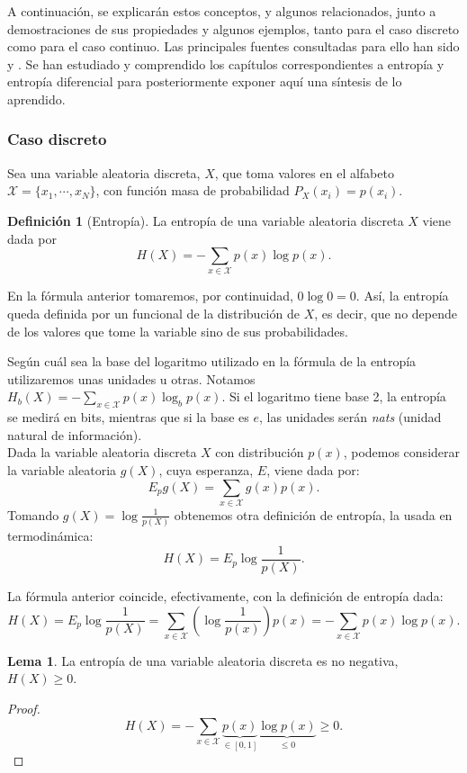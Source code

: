 \documentclass[10pt,a4paper]{article} %
\theoremstyle{definition}
\newtheorem{definition}{Definición}[section]
\newtheorem{lemma}[theorem]{Lema}
\begin{document}
A continuación, se explicarán estos conceptos, y algunos relacionados, junto a demostraciones de sus propiedades y algunos ejemplos, tanto para el caso discreto como para el caso continuo. Las principales fuentes consultadas para ello han sido \cite{thomas} y \cite{gray}. Se han estudiado y comprendido los capítulos correspondientes a entropía y entropía diferencial para posteriormente exponer aquí una síntesis de lo aprendido.

\subsubsection{Caso discreto}
    
Sea una variable aleatoria discreta, $X$, que toma valores en el alfabeto $\mathcal{X} = \{x_1, \cdots, x_N \}$, con función masa de probabilidad $P_X(x_i) = p(x_i)$.

\begin{definition}[Entropía]
  La entropía de una variable aleatoria discreta $X$ viene dada por \[H(X) = - \sum_{x\in \mathcal{X}} p(x) \log p(x).\]
\end{definition}

En la fórmula anterior tomaremos, por continuidad, $0 \log 0 = 0$. Así, la entropía queda definida por un funcional de la distribución de $X$, es decir, que no depende de los valores que tome la variable sino de sus probabilidades.

Según cuál sea la base del logaritmo utilizado en la fórmula de la entropía utilizaremos unas unidades u otras. Notamos $H_b(X) = - \sum_{x\in \mathcal{X}} p(x) \log_b p(x)$. Si el logaritmo tiene base 2, la entropía se medirá en bits, mientras que si la base es $e$, las unidades serán \textit{nats} (unidad natural de información).\\

Dada la variable aleatoria discreta $X$ con distribución $p(x)$, podemos considerar la variable aleatoria $g(X)$, cuya esperanza, $E$, viene dada por:\[
E_pg(X) = \sum_{x\in \mathcal{X}}g(x)p(x).
\]
Tomando $g(X) = \log \frac{1}{p(X)}$ obtenemos otra definición de entropía, la usada en termodinámica:\[
H(X) = E_p \log \frac{1}{p(X)}.
\]

La fórmula anterior coincide, efectivamente, con la definición de entropía dada:\[
H(X) = E_p \log \frac{1}{p(X)} = \sum_{x\in \mathcal{X}}\left ( \log \frac{1}{p(x)} \right ) p(x) = - \sum_{x \in \mathcal{X}}p(x)\log p(x).
\]

\begin{lemma} La entropía de una variable aleatoria discreta es no negativa, $H(X) \ge 0$.
\end{lemma}
\begin{proof}
  \[H(X) = - \sum_{x \in \mathcal{X}}\underbrace{p(x)}_{\in [0,1]}\underbrace{\log p(x)}_{\leq 0} \ge 0.\]

\end{proof}
\end{document}
